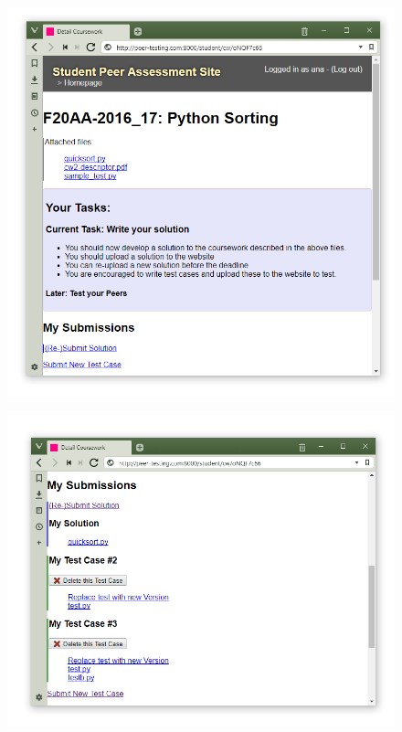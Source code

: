 \documentclass[sigplan,10pt,review]{acmart}\settopmatter{printfolios=true}
\begin{document}
\begin{figure}
  \begin{minipage}{.45\linewidth}
\begin{minipage}[t]{1\linewidth}
  \centering
  \includegraphics[width=1\linewidth]{screenshot-stage0-1}
  \label{fig:stage-0}
\end{minipage}%

\begin{minipage}[t]{1\linewidth}
  \centering
  \includegraphics[width=1\linewidth]{screenshot-stage1-1}
  \label{fig:stage-1-1}
\end{minipage}%


\end{minipage}
\end{figure}
\end{document}
